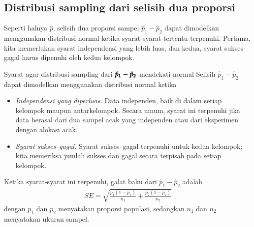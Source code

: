 \subsection{Distribusi sampling dari selisih
    dua proporsi}

Seperti halnya $\hat{p}$, selisih dua
proporsi sampel $\hat{p}_1 - \hat{p}_2$ dapat dimodelkan
menggunakan distribusi normal ketika syarat-syarat tertentu
terpenuhi.
Pertama, kita memerlukan syarat independensi yang lebih luas,
dan kedua,
syarat sukses--gagal harus dipenuhi oleh kedua kelompok.

\begin{onebox}{Syarat agar
    distribusi sampling dari
    $\pmb{\hat{\MakeLowercase{p}}_1 -
        \hat{\MakeLowercase{p}}_2}$
    mendekati normal}
  Selisih $\hat{p}_1 - \hat{p}_2$ dapat dimodelkan
  menggunakan distribusi normal ketika
  \begin{itemize}
  \setlength{\itemsep}{0mm}
  \item \emph{Independensi yang diperluas.}
    Data independen, baik di dalam setiap kelompok maupun
    antarkelompok.
    Secara umum, syarat ini terpenuhi jika data berasal
    dari dua sampel acak yang independen
    atau dari eksperimen dengan alokasi acak.
  \item \emph{Syarat sukses--gagal.}
    Syarat sukses--gagal terpenuhi untuk kedua
    kelompok; kita memeriksa jumlah sukses dan gagal
    secara terpisah pada setiap kelompok.
  \end{itemize}
  Ketika syarat-syarat ini terpenuhi,
  galat baku dari $\hat{p}_1 - \hat{p}_2$ adalah
  \begin{eqnarray*}
  SE %
    = \sqrt{\frac{p_1(1-p_1)}{n_1} + \frac{p_2(1-p_2)}{n_2}}
  \label{seForDiffOfProp}
  \end{eqnarray*}
  dengan $p_1$ dan $p_2$ menyatakan proporsi populasi,
  sedangkan $n_1$ dan $n_2$ menyatakan ukuran sampel.
\end{onebox}


